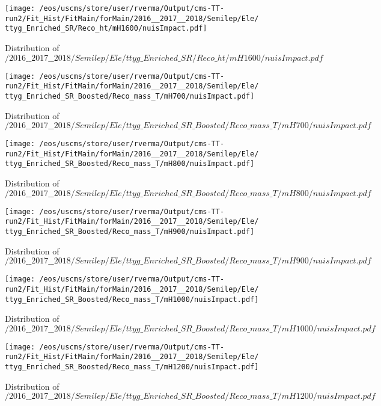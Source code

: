 \begin{figure}
\centering
\texttt{[image: /eos/uscms/store/user/rverma/Output/cms-TT-run2/Fit\_Hist/FitMain/forMain/2016\_\_2017\_\_2018/Semilep/Ele/ttyg\_Enriched\_SR/Reco\_ht/mH1600/nuisImpact.pdf]}
\caption{Distribution of $/2016\_\_2017\_\_2018/Semilep/Ele/ttyg\_Enriched\_SR/Reco\_ht/mH1600/nuisImpact.pdf$}
\end{figure}

\begin{figure}
\centering
\texttt{[image: /eos/uscms/store/user/rverma/Output/cms-TT-run2/Fit\_Hist/FitMain/forMain/2016\_\_2017\_\_2018/Semilep/Ele/ttyg\_Enriched\_SR\_Boosted/Reco\_mass\_T/mH700/nuisImpact.pdf]}
\caption{Distribution of $/2016\_\_2017\_\_2018/Semilep/Ele/ttyg\_Enriched\_SR\_Boosted/Reco\_mass\_T/mH700/nuisImpact.pdf$}
\end{figure}

\begin{figure}
\centering
\texttt{[image: /eos/uscms/store/user/rverma/Output/cms-TT-run2/Fit\_Hist/FitMain/forMain/2016\_\_2017\_\_2018/Semilep/Ele/ttyg\_Enriched\_SR\_Boosted/Reco\_mass\_T/mH800/nuisImpact.pdf]}
\caption{Distribution of $/2016\_\_2017\_\_2018/Semilep/Ele/ttyg\_Enriched\_SR\_Boosted/Reco\_mass\_T/mH800/nuisImpact.pdf$}
\end{figure}

\begin{figure}
\centering
\texttt{[image: /eos/uscms/store/user/rverma/Output/cms-TT-run2/Fit\_Hist/FitMain/forMain/2016\_\_2017\_\_2018/Semilep/Ele/ttyg\_Enriched\_SR\_Boosted/Reco\_mass\_T/mH900/nuisImpact.pdf]}
\caption{Distribution of $/2016\_\_2017\_\_2018/Semilep/Ele/ttyg\_Enriched\_SR\_Boosted/Reco\_mass\_T/mH900/nuisImpact.pdf$}
\end{figure}

\begin{figure}
\centering
\texttt{[image: /eos/uscms/store/user/rverma/Output/cms-TT-run2/Fit\_Hist/FitMain/forMain/2016\_\_2017\_\_2018/Semilep/Ele/ttyg\_Enriched\_SR\_Boosted/Reco\_mass\_T/mH1000/nuisImpact.pdf]}
\caption{Distribution of $/2016\_\_2017\_\_2018/Semilep/Ele/ttyg\_Enriched\_SR\_Boosted/Reco\_mass\_T/mH1000/nuisImpact.pdf$}
\end{figure}

\begin{figure}
\centering
\texttt{[image: /eos/uscms/store/user/rverma/Output/cms-TT-run2/Fit\_Hist/FitMain/forMain/2016\_\_2017\_\_2018/Semilep/Ele/ttyg\_Enriched\_SR\_Boosted/Reco\_mass\_T/mH1200/nuisImpact.pdf]}
\caption{Distribution of $/2016\_\_2017\_\_2018/Semilep/Ele/ttyg\_Enriched\_SR\_Boosted/Reco\_mass\_T/mH1200/nuisImpact.pdf$}
\end{figure}

